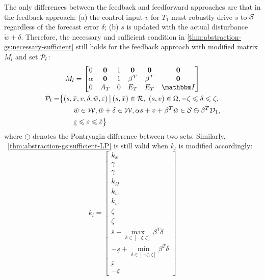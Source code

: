 The only differences between the feedback and feedforward approaches are that in the feedback approach: (a) the control input $v$ for $T_{1}$ must robustly drive $s$ to $\mathcal{S}$ regardless of the forecast error $\delta$; (b) $s$ is updated with the actual disturbance $\tilde{w} + \delta$.
Therefore, the necessary and sufficient condition in \cref{thm:abstraction-gs:necessary-sufficient} still holds for the feedback approach with modified matrix $M_{l}$ and set $\mathcal{P}_{l}$:
\begin{gather*}
  M_l =
  \begin{bmatrix}
    0 & \Zero & 1 & \Zero & \Zero & \Zero \\
    \alpha & \Zero & 1 & \beta^{T} & \beta^{T} & \Zero \\
    0 & A_T & 0 & E_T & E_T & \IdentityMatrix
  \end{bmatrix}\\
  \begin{aligned}
    \PSet_l =& \big\{ (s,\overbar{x}, v, \delta, \tilde{w}, \varepsilon) \,\big|\,
    (s,\overbar{x}) \in \RSet,\ (s,v) \in \Omega, -\zeta \leqslant \delta \leqslant \zeta,\big.\\
    &\qquad \big. \tilde{w} \in \WSet, \tilde{w} + \delta \in \WSet, \alpha s + v + \beta^{T} \tilde{w} \in \SSet \ominus \beta^{T} \mathcal{D}_{1},\\
    &\qquad \underline{\varepsilon} \leqslant \varepsilon \leqslant \overbar{\varepsilon} \big\}
  \end{aligned}
\end{gather*}
where $\ominus$ denotes the Pontryagin difference between two sets.
Similarly, ~\cref{thm:abstraction-gs:sufficient-LP} is still valid when $k_{l}$ is modified accordingly:
\begin{equation*}
    k_{l} =
    \left[ \begin{smallmatrix}
      k_{x} \\
      \gamma \\
      \gamma \\
      k_{\Omega} \\
      k_{w} \\
      k_{w} \\
      \zeta \\
      \zeta \\
      \overbar{s} - \max_{\delta \in [-\zeta, \zeta]} \beta^{T} \delta\\
      -\underline{s} + \min_{\delta \in [-\zeta, \zeta]} \beta^{T} \delta\\
      \overbar{\varepsilon} \\
      -\underline{\varepsilon} 
    \end{smallmatrix} \right]
  \end{equation*}


